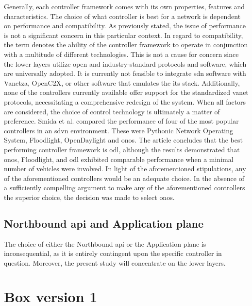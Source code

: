 Generally, each controller framework comes with its own properties, features and characteristics. The choice of what controller is best for a network is dependent on performance and compatibility.  As previously stated, the issue of performance is not a significant concern in this particular context. In regard to compatibility, the term denotes the ability of the controller framework to operate in conjunction with a multitude of different technologies. This is not a cause for concern since the lower layers utilize open and industry-standard protocols and software, which are universally adopted.
It is currently not feasible to integrate \gls{sdn} software with Vanetza, OpenC2X, or other software that emulates the \gls{its} stack. Additionally, none of the controllers currently available offer support for the standardized \gls{vanet} protocols, necessitating a comprehensive redesign of the system.
When all factors are considered, the choice of control technology is ultimately a matter of preference. Smida et al.\cite{smida_efficient_2020} compared the performance of four of the most popular controllers in an \gls{sdvn} environment. These were Pythonic Network Operating System, Floodlight, OpenDaylight and \gls{onos}. The article concludes that the best performing controller framework is \gls{odl}, although the results demonstrated that \gls{onos}, Floodlight, and \gls{odl} exhibited comparable performance when a minimal number of vehicles were involved. In light of the aforementioned stipulations, any of the aforementioned controllers would be an adequate choice. In the absence of a sufficiently compelling argument to make any of the aforementioned controllers the superior choice, the decision was made to select \gls{onos}\cite{noauthor_opennetworkinglabonos_nodate}.


\subsection[Northbound API and Application plane]{Northbound \gls{api} and Application plane}

The choice of either the Northbound \gls{api} or the Application plane is inconsequential, as it is entirely contingent upon the specific controller in question. Moreover, the present study will concentrate on the lower layers.

\section{Box version 1}
\label{sec:box_v1}


